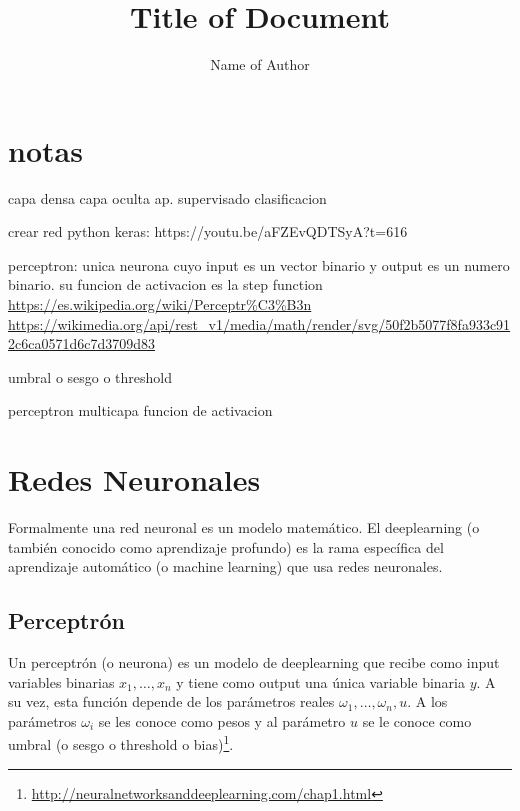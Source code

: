 \documentclass{article}
\title{Title of Document}
\author{Name of Author}
\begin{document}
\maketitle

\section{notas}

capa densa
capa oculta
ap. supervisado
clasificacion



crear red python keras: https://youtu.be/aFZEvQDTSyA?t=616

perceptron: unica neurona cuyo input es un vector binario y output es un numero binario. su funcion de activacion es la step function
\url{https://es.wikipedia.org/wiki/Perceptr%C3%B3n}
\url{https://wikimedia.org/api/rest_v1/media/math/render/svg/50f2b5077f8fa933c912c6ca0571d6c7d3709d83}

umbral o sesgo o threshold

perceptron multicapa 
funcion de activacion

\section{Redes Neuronales}


Formalmente una red neuronal es un modelo matemático. El deeplearning (o también conocido como aprendizaje profundo) es la rama específica del aprendizaje automático (o machine learning) que usa redes neuronales.\\


\subsection{Perceptrón}

Un perceptrón (o neurona) es un modelo de deeplearning que recibe como input variables binarias $x_1,\hdots,x_n $ y tiene como output una única variable binaria $y$. A su vez, esta función depende de los parámetros reales $\omega_1,\hdots,\omega_n,u $. A los parámetros $\omega_i$ se les conoce como pesos y al parámetro $u$ se le conoce como umbral (o sesgo o threshold o bias)\footnote{\url{http://neuralnetworksanddeeplearning.com/chap1.html}}.\\
\end{document}
